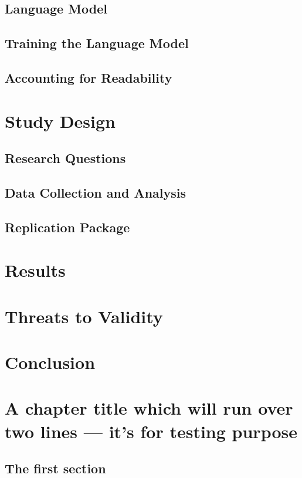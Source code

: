 \documentclass[12pt,mscthesis]{usiinfthesis}
\begin{document}
	\section{Language Model}
	\section{Training the Language Model}
	\section{Accounting for Readability}

\chapter{Study Design}
	\section{Research Questions}
	\section{Data Collection and Analysis}	
	\section{Replication Package}

\chapter{Results}

\chapter{Threats to Validity}

\chapter{Conclusion}

\chapter[Short title]{A chapter title which will run over two lines --- it's for
  testing purpose}

\lipsum[1-2]

\section{The first section}
\lipsum[3-4]
\end{document}
